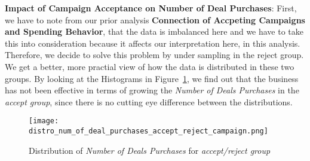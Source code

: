 \documentclass[a4paper,12pt]{article}
\begin{document}
\noindent \textbf{Impact of Campaign Acceptance on Number of Deal Purchases}: First, we have to note from our prior analysis \textbf{Connection of Accpeting Campaigns and Spending Behavior}, that the data is imbalanced here and we have to take this into consideration because it affects our interpretation here, in this analysis. 
Therefore, we decide to solve this problem by under sampling in the reject group. We get a better, more practial view of how the data is distributed in these two groups.
By looking at the Histograms in Figure~\ref{fig:Figure_8}, we find out that the business has not been effective in terms of growing the \textit{Number of Deals Purchases} in the \textit{accept group}, since there is no cutting eye difference between the distributions.

\begin{figure}[H]
    \centering
    \texttt{[image: distro\_num\_of\_deal\_purchases\_accept\_reject\_campaign.png]}
    \caption{Distribution of \textit{Number of Deals Purchases} for \textit{accept/reject group}}
    \label{fig:Figure_8}
\end{figure}


\end{document}
